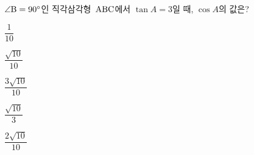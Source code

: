 $\angle\mathrm{B}=90^\circ$인 직각삼각형~$\mathrm{ABC}$에서 $\tan A=3$일 때, $\cos A$의 값은?
\begin{choices32}{\rule[-3ex]{0pt}{8ex}$\dfrac{1}{10}$}{\rule[-3ex]{0pt}{8ex}$\dfrac{\sqrt{10}}{10}$}{\rule[-3ex]{0pt}{8ex}$\dfrac{3\sqrt{10}}{10}$}{\rule[-3ex]{0pt}{8ex}$\dfrac{\sqrt{10}}{3}$}{\rule[-3ex]{0pt}{8ex}$\dfrac{2\sqrt{10}}{10}$}\end{choices32}
